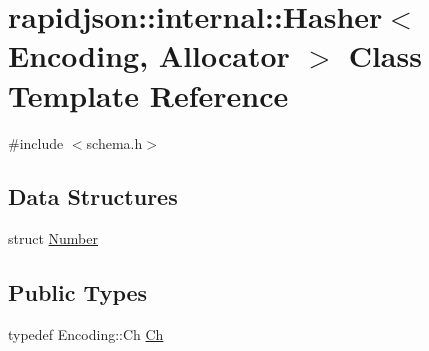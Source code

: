 \hypertarget{classrapidjson_1_1internal_1_1_hasher}{}\section{rapidjson\+::internal\+::Hasher$<$ Encoding, Allocator $>$ Class Template Reference}
\label{classrapidjson_1_1internal_1_1_hasher}


{\ttfamily \#include $<$schema.\+h$>$}

\subsection*{Data Structures}
\begin{DoxyCompactItemize}
\item 
struct \mbox{\hyperlink{structrapidjson_1_1internal_1_1_hasher_1_1_number}{Number}}
\end{DoxyCompactItemize}
\subsection*{Public Types}
\begin{DoxyCompactItemize}
\item 
typedef Encoding\+::\+Ch \mbox{\hyperlink{classrapidjson_1_1internal_1_1_hasher_ae583d393fe48a90f9369f1fb5e488ab9}{Ch}}
\end{DoxyCompactItemize}
